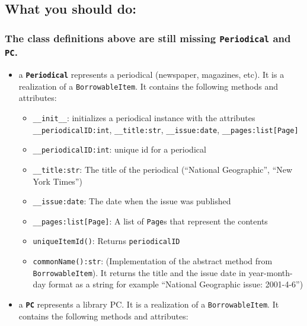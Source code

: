 \subsection{What you should
do:}\label{lab-exercise-6-borrowing-from-the-library.md__what-you-should-do}

\subsubsection{\texorpdfstring{The class definitions above are still
missing \texttt{Periodical} and
\texttt{PC}.}{The class definitions above are still missing Periodical and PC.}}\label{lab-exercise-6-borrowing-from-the-library.md__the-class-definitions-above-are-still-missing-periodical-and-pc.}

\begin{itemize}
\tightlist
\item
  a \textbf{\texttt{Periodical}} represents a periodical (newspaper,
  magazines, etc). It is a realization of a \texttt{BorrowableItem}. It
  contains the following methods and attributes:

  \begin{itemize}
  \tightlist
  \item
    \texttt{\_\_init\_\_}: initializes a periodical instance with the
    attributes \texttt{\_\_periodicalID:int}, \texttt{\_\_title:str},
    \texttt{\_\_issue:date}, \texttt{\_\_pages:list{[}Page{]}}
  \item
    \texttt{\_\_periodicalID:int}: unique id for a periodical
  \item
    \texttt{\_\_title:str}: The title of the periodical (``National
    Geographic'', ``New York Times'')
  \item
    \texttt{\_\_issue:date}: The date when the issue was published
  \item
    \texttt{\_\_pages:list{[}Page{]}}: A list of \texttt{Page}s that
    represent the contents
  \item
    \texttt{uniqueItemId()}: Returns \texttt{periodicalID}
  \item
    \texttt{commonName():str}: (Implementation of the abstract method
    from \texttt{BorrowableItem}). It returns the title and the issue
    date in year-month-day format as a string for example ``National
    Geographic issue: 2001-4-6'')
  \end{itemize}
\item
  a \textbf{\texttt{PC}} represents a library PC. It is a realization of
  a \texttt{BorrowableItem}. It contains the following methods and
  attributes:


\end{itemize}
